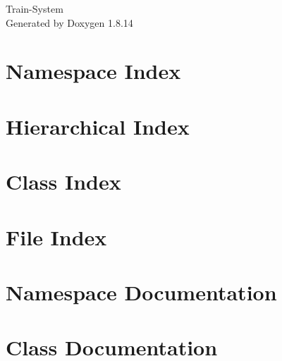 \documentclass[twoside]{book}
\newcommand{\+}{\discretionary{\mbox{\scriptsize$\hookleftarrow$}}{}{}}
\newcommand{\clearemptydoublepage}{%
  \newpage{\pagestyle{empty}\cleardoublepage}%
}
\begin{document}
\hypersetup{pageanchor=false,
             bookmarksnumbered=true,
             pdfencoding=unicode
            }
\begin{titlepage}
\vspace*{7cm}
\begin{center}%
{\Large Train-\/\+System }\\
\vspace*{1cm}
{\large Generated by Doxygen 1.8.14}\\
\end{center}
\end{titlepage}
\clearemptydoublepage
{}
\tableofcontents
\clearemptydoublepage
{}
\hypersetup{pageanchor=true}

\chapter{Namespace Index}

\chapter{Hierarchical Index}

\chapter{Class Index}

\chapter{File Index}

\chapter{Namespace Documentation}

\chapter{Class Documentation}




























\end{document}
